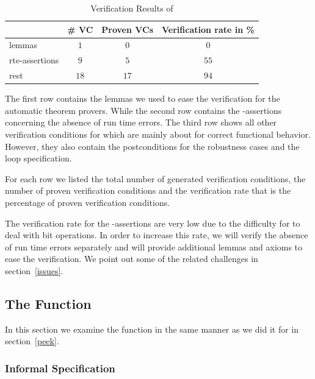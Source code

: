 \begin{table}
  \centering
  \begin{tabular}[htb]{lccc}
    \toprule
     & \# VC & Proven VCs & Verification rate in \%\\
    \midrule
    lemmas & $1$ &$0$ & $0$ \\
    rte-assertions&$9$&$5$&$55$\\
    rest &$18$ &$17$&$94$\\
    \bottomrule
  \end{tabular}
  \caption{Verification Results of \peek}
  \label{tab:results-peek}
\end{table}


The first row contains the lemmas we used to ease the verification for the automatic theorem provers.
While the second row contains the -assertions 
concerning the absence of run time errors.
The third row shows all other verification conditions for \peek
which are mainly about for correct functional behavior.
However, they also contain the postconditions for the robustness cases
and the loop specification.

For each row we listed the total number of generated verification conditions,
the number of proven verification conditions and the verification rate
that is the percentage of proven verification conditions. 

The verification rate for the -assertions are very low 
due to the difficulty for \framac to deal with bit operations.
In order to increase this rate, we will verify the absence
of run time errors separately and will provide additional lemmas and axioms
to ease the verification.
We point out some of the related challenges in section~\ref{issues}.



\FloatBarrier



\subsection{The Function \poke}
\label{poke}


In this section we examine the function \poke
in the same manner as we did it for \peek in section~\ref{peek}.

\subsubsection{Informal Specification}
\label{informal-poke}

